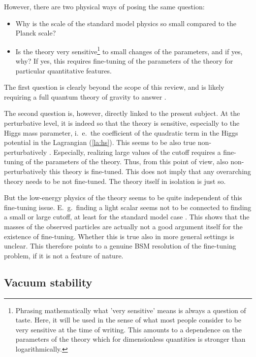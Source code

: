 \documentclass[final,12pt]{article}
\newcommand*{\pref}[1]{(\ref{#1})}
\newcommand*{\1}{1\!\!\!\bot}
\begin{document}
However, there are two physical ways of posing the same question:
\begin{itemize}
 \item Why is the scale of the standard model physics so small compared to the Planck scale?
 \item Is the theory very sensitive\footnote{Phrasing mathematically what 'very sensitive' means is always a question of taste. Here, it will be used in the sense of what most people consider to be very sensitive at the time of writing. This amounts to a dependence on the parameters of the theory which for dimensionless quantities is stronger than logarithmically.} to small changes of the parameters, and if yes, why? If yes, this requires fine-tuning of the parameters of the theory for particular quantitative features.
\end{itemize}
The first question is clearly beyond the scope of this review, and is likely requiring a full quantum theory of gravity to answer \cite{Shaposhnikov:2009pv,Dona:2013qba,Eichhorn:2016esv,Litim:2011qf}.

The second question is, however, directly linked to the present subject. At the perturbative level, it is indeed so \cite{Feng:2013pwa,Callaway:1988ya,Morrissey:2009tf} that the theory is sensitive, especially to the Higgs mass parameter, i.\ e.\ the coefficient of the quadratic term in the Higgs potential in the Lagrangian \pref{la:hs}. This seems to be also true non-perturbatively \cite{Maas:2014pba,Gies:2015lia,Gies:2016kkk}. Especially, realizing large values of the cutoff requires a fine-tuning of the parameters of the theory. Thus, from this point of view, also non-perturbatively this theory is fine-tuned. This does not imply that any overarching theory needs to be not fine-tuned. The theory itself in isolation is just so.

But the low-energy physics of the theory seems to be quite independent of this fine-tuning issue. E.\ g.\ finding a light scalar seems not to be connected to finding a small or large cutoff, at least for the standard model case \cite{Maas:2014pba}. This shows that the masses of the observed particles are actually not a good argument itself for the existence of fine-tuning. Whether this is true also in more general settings is unclear. This therefore points to a genuine BSM resolution of the fine-tuning problem, if it is not a feature of nature.

\subsection{Vacuum stability}\label{ss:vs}
\end{document}

